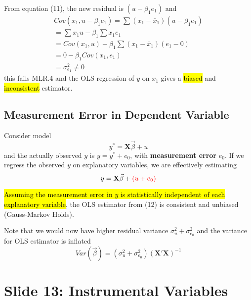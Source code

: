 \documentclass[]{article}
\begin{document}
				\begin{remark}
					From equation (11), the new residual is $(u - \beta_1 e_1)$ and
					\begin{gather*}
						Cov(x_1, u - \beta_1 e_1) = \sum{(x_1 - \overline{x}_1) (u - \beta_1 e_1)} \\
						= \sum {x_1 u} - \beta_1 \sum {x_1 e_1} \\
						= Cov(x_1, u) - \beta_1 \sum {(x_1 - \overline{x}_1)(e_1 - 0)} \\
						= 0 - \beta_1 Cov(x_1, e_1) \\
						= \sigma_{e_1}^2 \neq 0
					\end{gather*}
					this fails MLR.4 and the OLS regression of $y$ on $x_1$ gives a \hl{biased} and \hl{inconsistent} estimator.
				\end{remark}

		\subsection{Measurement Error in Dependent Variable}
			\par Consider model 
			\begin{equation}
				y^{*} = \textbf{X}\vec{\beta} + u
			\end{equation}
			and the actually observed $y$ is $y = y^{*} + e_0$, with \textbf{measurement error} $e_0$. If we regress the observed $y$ on explanatory variables, we are effectively estimating
			\begin{equation}
				y = \textbf{X}\vec{\beta} + \textcolor{red}{(u+e_0)}
			\end{equation}
			\begin{remark}
				\hl{Assuming the measurement error in $y$ is statistically independent of each explanatory variable}, the OLS estimator from (12) is consistent and unbiased (Gauss-Markov Holds).
			\end{remark}
			\begin{remark}
			Note that we would now have higher residual variance $\sigma_u^2 + \sigma_{e_0}^2$ and the variance for OLS estimator is inflated
				\[
					Var(\vec{\beta}) = (\sigma_u^2 + \sigma_{e_0}^2) (\textbf{X}'\textbf{X})^{-1}
				\]
			\end{remark}
			
			
			
	\section{Slide 13: Instrumental Variables}
\end{document}
